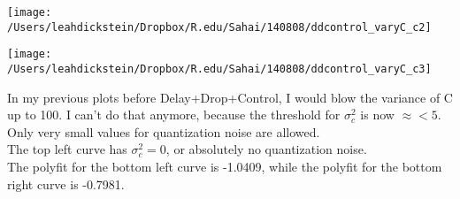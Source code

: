 \documentclass[leqno,twocolumn]{article}
\begin{document}
\begin{minipage}[c]{0.5\textwidth}
\texttt{[image: /Users/leahdickstein/Dropbox/R.edu/Sahai/140808/ddcontrol\_varyC\_c2]}
\end{minipage}
\begin{minipage}[c]{0.5\textwidth}
\texttt{[image: /Users/leahdickstein/Dropbox/R.edu/Sahai/140808/ddcontrol\_varyC\_c3]}
\end{minipage}

In my previous plots before Delay+Drop+Control, I would blow the variance of C up to 100. I can't do that anymore, because the threshold for $\sigma_c^2$ is now $\approx < 5$. Only very small values for quantization noise are allowed.\\
The top left curve has $\sigma_c^2 = 0$, or absolutely no quantization noise.\\
The polyfit for the bottom left curve is -1.0409, while the polyfit for the bottom right curve is -0.7981.
\end{document}
